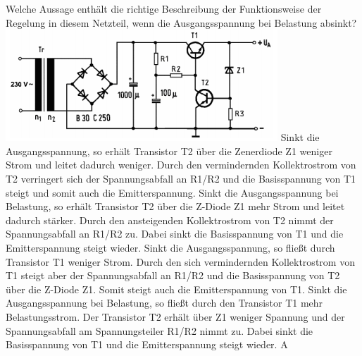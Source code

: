 {Welche Aussage enthält die richtige Beschreibung der Funktionsweise der Regelung in diesem Netzteil, wenn die Ausgangsspannung bei Belastung absinkt?\\ \includegraphics[scale=0.6]{Schaltungstechnik/Bilder/TD306.png}}%
{Sinkt die Ausgangsspannung, so erhält Transistor T2 über die Zenerdiode Z1 weniger Strom und leitet dadurch weniger. Durch den vermindernden Kollektrostrom von T2 verringert sich der Spannungsabfall an R1/R2 und die Basisspannung von T1 steigt und somit auch die Emitterspannung.}%
{Sinkt die Ausgangsspannung bei Belastung, so erhält Transistor T2 über die Z-Diode Z1 mehr Strom und leitet dadurch stärker. Durch den ansteigenden Kollektrostrom von T2 nimmt der Spannungsabfall an R1/R2 zu. Dabei sinkt die Basisspannung von T1 und die Emitterspannung steigt wieder.}%
{Sinkt die Ausgangsspannung, so fließt durch Transistor T1 weniger Strom. Durch den sich vermindernden Kollektrostrom von T1 steigt aber der Spannungsabfall an R1/R2 und die Basisspannung von T2 über die Z-Diode Z1. Somit steigt auch die Emitterspannung von T1.}%
{Sinkt die Ausgangsspannung bei Belastung, so fließt durch den Transistor T1 mehr Belastungsstrom. Der Transistor T2 erhält über Z1 weniger Spannung und der Spannungsabfall am Spannungsteiler R1/R2 nimmt zu. Dabei sinkt die Basisspannung von T1 und die Emitterspannung steigt wieder.}%
{A}%
